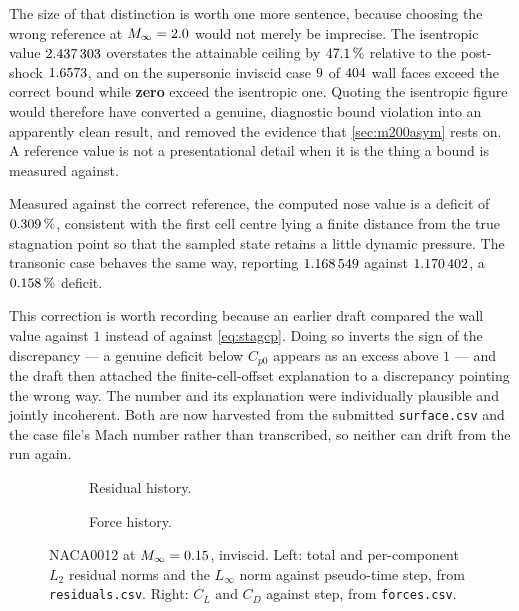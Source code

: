 The size of that distinction is worth one more sentence, because choosing the wrong
reference at $M_\infty=2.0$ would not merely be imprecise. The isentropic value
$\num{2.437303}$ overstates the attainable ceiling by
$\num{47.1}\,\%$ relative to the
post-shock $\num{1.6573}$, and on the supersonic inviscid case
$\num{9}$ of $\num{404}$ wall faces exceed the correct
bound while \textbf{zero} exceed the isentropic one. Quoting the isentropic figure
would therefore have converted a genuine, diagnostic bound violation into an apparently
clean result, and removed the evidence that \cref{sec:m200asym} rests on. A reference value
is not a presentational detail when it is the thing a bound is measured against.

Measured against the correct reference, the computed nose value is a deficit of
$\num{0.309}\,\%$, consistent with the first cell centre lying a
finite distance from the true stagnation point so that the sampled state retains a
little dynamic pressure. The transonic case behaves the same way, reporting
$\num{1.168549}$ against $\num{1.170402}$, a
$\num{0.158}\,\%$ deficit.

This correction is worth recording because an earlier draft compared the wall value
against $1$ instead of against \cref{eq:stagcp}. Doing so inverts the sign of the
discrepancy --- a genuine deficit below $C_{p0}$ appears as an excess above $1$ --- and
the draft then attached the finite-cell-offset explanation to a discrepancy pointing the
wrong way. The number and its explanation were individually plausible and jointly
incoherent. Both are now harvested from the submitted \texttt{surface.csv} and the case
file's Mach number rather than transcribed, so neither can drift from the run again.

\begin{figure}[htbp]
  \centering
  \begin{subfigure}{0.49\textwidth}\centering
    \caption{Residual history.}
  \end{subfigure}\hfill
  \begin{subfigure}{0.49\textwidth}\centering
    \caption{Force history.}
  \end{subfigure}
  \caption{NACA0012 at $M_\infty=0.15$, inviscid. Left: total and per-component
  $L_2$ residual norms and the $L_\infty$ norm against pseudo-time step, from
  \texttt{residuals.csv}. Right: $C_L$ and $C_D$ against step, from
  \texttt{forces.csv}.}
  \label{fig:naca015inv-hist}
\end{figure}


